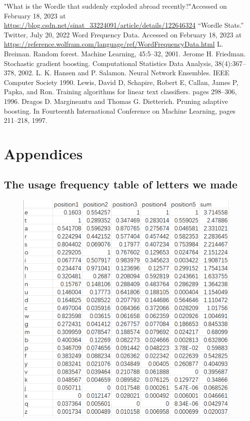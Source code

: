 \documentclass[12pt]{article}
\begin{document}
\begin{thebibliography}{99}
	"What is the Wordle that suddenly exploded abroad recently?"Accessed on February 18, 2023 at \url{https://blog.csdn.net/sinat_33224091/article/details/122646324}
	 “Wordle Stats.” Twitter, July 20, 2022
    Word Frequency Data. Accessed on February 18, 2023 at \url{https://reference.wolfram.com/language/ref/WordFrequencyData.html}
    L. Breiman. Random forest. Machine Learning, 45:5–32, 2001.
    Jerome H. Friedman. Stochastic gradient boosting. Computational Statistics Data Analysis, 38(4):367–378, 2002.
     L. K. Hansen and P. Salamon. Neural Network Ensembles. IEEE Computer Society 1990.
    Lewis, David D, Schapire, Robert E, Callan, James P, Papka, and Ron. Training algorithms for linear text classifiers. pages 298–306, 1996.
    Dragos D. Margineantu and Thomas G. Dietterich. Pruning adaptive boosting. In Fourteenth International Conference on Machine Learning, pages 211–218, 1997.
\end{thebibliography}


\newpage
\section{Appendices}
\subsection{The usage frequency table of letters we made}
\begin{figure}[H]
    \centering
    \includegraphics[scale=1.32]{and1.png}
\end{figure}
\end{document}
